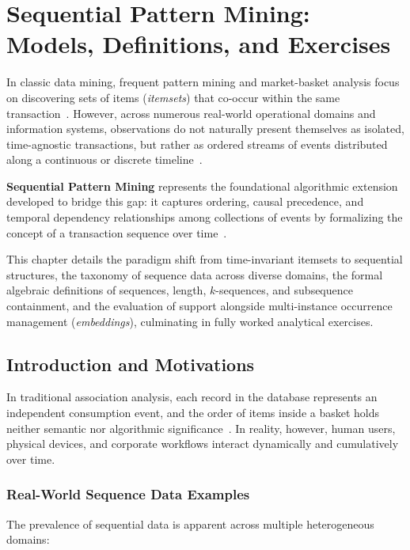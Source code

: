 \chapter{Sequential Pattern Mining: Models, Definitions, and Exercises}
\label{chap:dm-sequential-pattern-mining}

In classic data mining, frequent pattern mining and market-basket analysis focus on discovering sets of items (\textit{itemsets}) that co-occur within the same transaction~\cite{tan2018, agrawal1994}. However, across numerous real-world operational domains and information systems, observations do not naturally present themselves as isolated, time-agnostic transactions, but rather as ordered streams of events distributed along a continuous or discrete timeline~\cite{agrawal1995, srikant1996}.

\textbf{Sequential Pattern Mining} represents the foundational algorithmic extension developed to bridge this gap: it captures ordering, causal precedence, and temporal dependency relationships among collections of events by formalizing the concept of a transaction sequence over time~\cite{tan2018, agrawal1995}.

This chapter details the paradigm shift from time-invariant itemsets to sequential structures, the taxonomy of sequence data across diverse domains, the formal algebraic definitions of sequences, length, $k$-sequences, and subsequence containment, and the evaluation of support alongside multi-instance occurrence management (\textit{embeddings}), culminating in fully worked analytical exercises.

\section{Introduction and Motivations}
\label{sec:dm-seq-intro}

In traditional association analysis, each record in the database represents an independent consumption event, and the order of items inside a basket holds neither semantic nor algorithmic significance~\cite{tan2018}. In reality, however, human users, physical devices, and corporate workflows interact dynamically and cumulatively over time.

\subsection{Real-World Sequence Data Examples}
The prevalence of sequential data is apparent across multiple heterogeneous domains:

